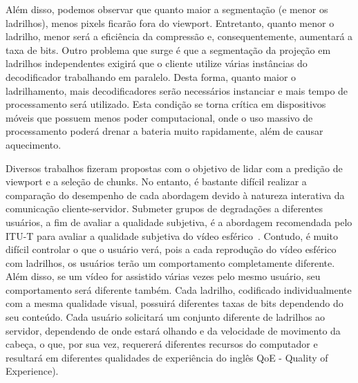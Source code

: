 Além disso, podemos observar que quanto maior a segmentação (e menor os ladrilhos), menos pixels ficarão fora do viewport. Entretanto, quanto menor o ladrilho, menor será a eficiência da compressão e, consequentemente, aumentará a taxa de bits. Outro problema que surge é que a segmentação da projeção em ladrilhos independentes exigirá que o cliente utilize várias instâncias do decodificador trabalhando em paralelo. Desta forma, quanto maior o ladrilhamento, mais decodificadores serão necessários instanciar e mais tempo de processamento será utilizado. Esta condição se torna crítica em dispositivos móveis que possuem menos poder computacional, onde o uso massivo de processamento poderá drenar a bateria muito rapidamente, além de causar aquecimento.

Diversos trabalhos fizeram propostas com o objetivo de lidar com a predição de viewport e a seleção de chunks. No entanto, é bastante difícil realizar a comparação do desempenho de cada abordagem devido à natureza interativa da comunicação cliente-servidor. Submeter grupos de degradações a diferentes usuários, a fim de avaliar a qualidade subjetiva, é a abordagem recomendada pelo ITU-T para avaliar a qualidade subjetiva do vídeo esférico~\cite{ITU-T2018}. Contudo, é muito difícil controlar o que o usuário verá, pois a cada reprodução do vídeo esférico com ladrilhos, os usuários terão um comportamento completamente diferente. Além disso, se um vídeo for assistido várias vezes pelo mesmo usuário, seu comportamento será diferente também. Cada ladrilho, codificado individualmente com a mesma qualidade visual, possuirá diferentes taxas de bits dependendo do seu conteúdo. Cada usuário solicitará um conjunto diferente de ladrilhos ao servidor, dependendo de onde estará olhando e da velocidade de movimento da cabeça, o que, por sua vez, requererá diferentes recursos do computador e resultará em diferentes qualidades de experiência do inglês QoE - Quality of Experience).

